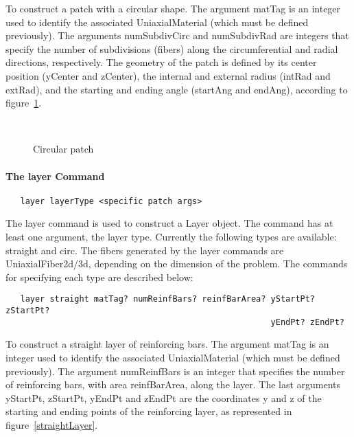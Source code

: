 \documentclass[12pt]{article}
\begin{document}
\noindent To construct a patch with a circular shape. The
argument matTag is an integer used to identify the associated
UniaxialMaterial (which must be defined previously). 
The arguments numSubdivCirc and numSubdivRad are integers
that specify the number of subdivisions (fibers) along the
circumferential and radial directions, respectively. 
The geometry of the patch is defined by its center position
(yCenter and zCenter), the internal and external radius 
(intRad and extRad), and the starting and ending angle (startAng 
and endAng), according to figure~\ref{circPatch}. 



\begin{figure}[htpb]
\begin{center}
\leavevmode
\hbox{%
}
\end{center}
\caption{Circular patch}
\label{circPatch}
\end{figure}

\paragraph{The layer Command}

{\sf\small
\begin{verbatim}
   layer layerType <specific patch args>
\end{verbatim}
}

The layer command is used to construct a Layer object. 
The command has at least one argument, the layer type. Currently 
the following types are available: straight and circ. The fibers
generated by the layer commands are UniaxialFiber2d/3d, depending on
the dimension of the problem. The commands
for specifying each type are described below:

{\sf\small
\begin{verbatim}
   layer straight matTag? numReinfBars? reinfBarArea? yStartPt? zStartPt? 
                                                      yEndPt? zEndPt?
\end{verbatim}
}

\noindent To construct a straight layer of reinforcing bars. The
argument matTag is an integer used to identify the associated
UniaxialMaterial (which must be defined previously). The argument 
numReinfBars is an integer that specifies the number of reinforcing 
bars, with area reinfBarArea, along the layer. The last arguments 
yStartPt, zStartPt, yEndPt and zEndPt are the coordinates y and z of 
the starting and ending points of the
reinforcing layer, as represented in figure~\ref{straightLayer}.
\end{document}
